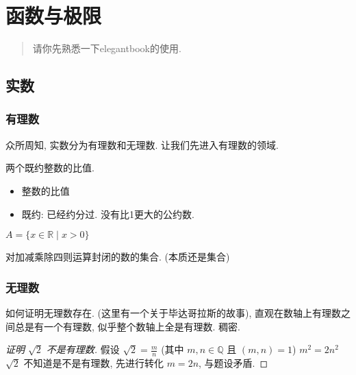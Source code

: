 \chapter{函数与极限}

\begin{abstract}
    请你先熟悉一下elegantbook的使用. 
\end{abstract}

\section{实数}

\subsection{有理数}

众所周知, 实数分为有理数和无理数. 让我们先进入有理数的领域. 

\begin{definition}[有理数]
    两个既约整数的比值. 
    \begin{itemize}
        \item 整数的比值
        \item 既约: 已经约分过. 没有比1更大的公约数. 
    \end{itemize}
     $A = \{ x \in \mathbb{R} \mid x > 0 \}$
\end{definition}

\begin{definition}[数域]
    对加减乘除四则运算封闭的数的集合. (本质还是集合)
\end{definition}
\begin{comment}
    if a \in \mathbb{R} and b \in \mathbb{R}. 
    then a+b, a-b, a*b, a/b \in \mathbb{R}. 
\end{comment}

\subsection{无理数}

如何证明无理数存在. (这里有一个关于毕达哥拉斯的故事), 直观在数轴上有理数之间总是有一个有理数, 似乎整个数轴上全是有理数. 稠密. 

\begin{proof}[证明 $\sqrt{2}$ 不是有理数]
    假设 \(\sqrt{2} = \frac{m}{n}\) (其中 \(m, n \in \mathbb{Q}\) 且 \((m, n) = 1\))
         \(m^2 = 2n^2\) \(\sqrt{2}\) 不知道是不是有理数, 先进行转化
         \(m = 2n\), 与题设矛盾. 
\end{proof}

